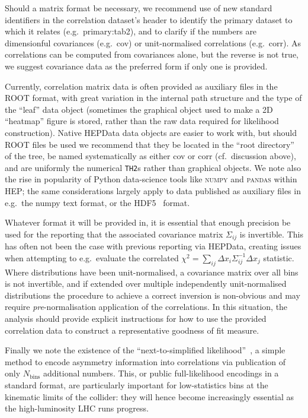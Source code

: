\documentclass[a4paper,aps,prd,longbibliography,notitlepage,showpacs,amsmath,amssymb,superscriptaddress,nofootinbib,floatfix,11pt,preprintnumbers]{revtex4-1-mod}
\newcommand{\kbd}[1]{\texttt{#1}}
\newcommand{\python}{\textsf{Python}\xspace}
\newcommand{\hepdata}{\textsf{HEPData}\xspace}
\renewcommand{\root}{\textsf{ROOT}\xspace}
\newcommand{\cf}{cf.\xspace}
\newcommand{\eg}{e.g.\xspace}
\renewcommand{\emph}[1]{\textit{#1}}
\begin{document}
Should a matrix format be necessary, we recommend use of new standard identifiers in the correlation dataset's header to identify the primary dataset to which it relates (\eg~\textsf{primary:tab2}), and to clarify if the numbers are dimensionful covariances (\eg~\textsf{cov}) or unit-normalised correlations (\eg~\textsf{corr}). As correlations can be computed from covariances alone, but the reverse is not true, we suggest covariance data as the preferred form if only one is provided.

Currently, correlation matrix data is often provided as auxiliary files in the \root format, with great variation in the internal path structure and the type of the ``leaf'' data object (sometimes the graphical object used to make a 2D ``heatmap'' figure is stored, rather than the raw data required for likelihood construction). Native \hepdata data objects are easier to work with, but should \root files be used we recommend that they be located in the ``root directory'' of the tree, be named systematically as either \textsf{cov} or \textsf{corr} (\cf~discussion above), and are uniformly the numerical \kbd{TH2}s rather than graphical objects. We note also the rise in popularity of \python data-science tools like \textsc{numpy} and \textsc{pandas} within HEP; the same considerations largely apply to data published as auxiliary files in \eg~the numpy text format, or the \textsc{HDF5}~\cite{hdf5} format.

Whatever format it will be provided in, it is essential that enough precision be used for the reporting that the associated covariance matrix $\Sigma_{ij}$ is invertible. This has often not been the case with previous reporting via \hepdata, creating issues when attempting to \eg~evaluate the correlated $\chi^2 = \sum_{ij} \Delta{x}_i \Sigma^{-1}_{ij} \Delta{x}_j$ statistic. Where distributions have been unit-normalised, a covariance matrix over all bins is not invertible, and if extended over multiple independently unit-normalised distributions the procedure to achieve a correct inversion is non-obvious and may require \emph{pre}-normalisation application of the correlations. In this situation, the analysis should provide explicit instructions for how to use the provided correlation data to construct a representative goodness of fit measure.

Finally we note the existence of the ``next-to-simplified likelihood''~\cite{Buckley:2018vdr}, a simple method to encode asymmetry information into correlations via publication of only $N_\text{bins}$ additional numbers. This, or public full-likelihood encodings in a standard format, are particularly important for low-statistics bins at the kinematic limits of the collider: they will hence become increasingly essential as the high-luminosity LHC runs progress.
\end{document}
